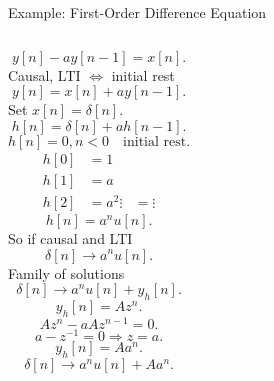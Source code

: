 \begin{frame}[plain]{Example: First-Order Difference Equation}
    \begin{columns}
        \begin{equation*}
            y[n]  - ay[n-1] = x[n].
        \end{equation*}
        Causal, LTI $\Longleftrightarrow$ initial rest\\
        \begin{equation*}
            y[n]  =  x[n] + ay[n-1].
        \end{equation*}
        Set $x[n] = \delta[n]$.
        \begin{equation*}
            h[n] = \delta[n] + ah[n-1].
        \end{equation*}
        \pause
        \begin{equation*}
            h[n] = 0, n < 0\quad \text{initial rest}.
        \end{equation*}
        \begin{align*}
          h[0] &= 1 \\
          h[1] &= a\\
          h[2] &= a^2
          \vdots &= \vdots
        \end{align*}
        \begin{equation*}
            h[n] = a^nu[n].
        \end{equation*}
        So if causal and LTI
        \begin{equation*}
            \delta[n] \rightarrow a^nu[n].
        \end{equation*}
        Family of solutions
        \begin{equation*}
            \delta[n] \rightarrow a^nu[n] + y_h[n].
        \end{equation*}
        \begin{equation*}
            y_h[n] =  Az^n.
        \end{equation*}
        \begin{equation*}
            Az^n - aAz^{n-1} = 0.
        \end{equation*}
        \begin{equation*}
            a - z^{-1} = 0 \Rightarrow z = a.
        \end{equation*}
        \begin{equation*}
            y_h[n] =  Aa^n.
        \end{equation*}
        \begin{equation*}
            \delta[n] \rightarrow a^nu[n] + Aa^n.
        \end{equation*}
    \end{columns}
\end{frame}


